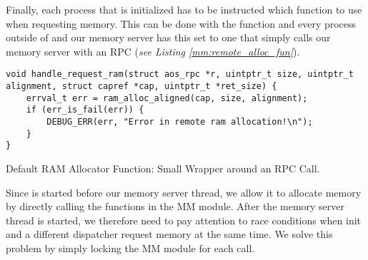 Finally, each process that is initialized has to be instructed which function to use when requesting memory. This can be done with the function  and every process outside of  and our memory server has this set to one that simply calls our memory server with an RPC (\emph{see Listing \ref{mm:remote_alloc_fun}}).

\begin{code}
\begin{mdframed}[style=myframe]
\begin{verbatim}
void handle_request_ram(struct aos_rpc *r, uintptr_t size, uintptr_t alignment, struct capref *cap, uintptr_t *ret_size) {
    errval_t err = ram_alloc_aligned(cap, size, alignment);
    if (err_is_fail(err)) {
        DEBUG_ERR(err, "Error in remote ram allocation!\n");
    }
}
\end{verbatim}
\end{mdframed}
\caption{Default RAM Allocator Function: Small Wrapper around an RPC Call.}
\end{code}
\label{mm:remote_alloc_fun}



Since  is started before our memory server thread, we allow it to allocate memory by
directly calling the functions in the MM module. After the memory server thread is started,
we therefore need to pay attention to race conditions when init and a different dispatcher
request memory at the same time. We solve this problem by simply locking the MM
module for each call. 

